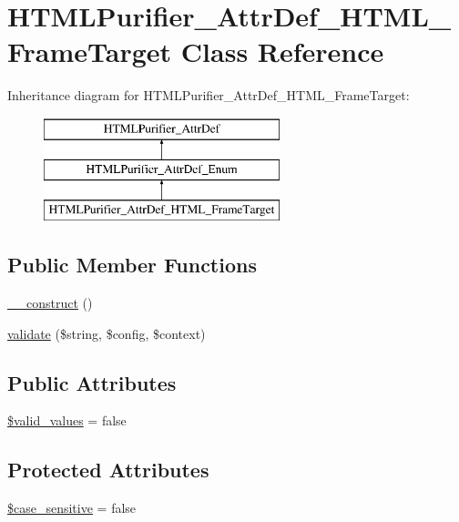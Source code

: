 \hypertarget{classHTMLPurifier__AttrDef__HTML__FrameTarget}{\section{H\+T\+M\+L\+Purifier\+\_\+\+Attr\+Def\+\_\+\+H\+T\+M\+L\+\_\+\+Frame\+Target Class Reference}
\label{classHTMLPurifier__AttrDef__HTML__FrameTarget}
}
Inheritance diagram for H\+T\+M\+L\+Purifier\+\_\+\+Attr\+Def\+\_\+\+H\+T\+M\+L\+\_\+\+Frame\+Target\+:\begin{figure}[H]
\begin{center}
\leavevmode
\includegraphics[height=3.000000cm]{classHTMLPurifier__AttrDef__HTML__FrameTarget}
\end{center}
\end{figure}
\subsection*{Public Member Functions}
\begin{DoxyCompactItemize}
\item 
\hyperlink{classHTMLPurifier__AttrDef__HTML__FrameTarget_a6d29f0eced4e7c1306ac1feeefc7d2a1}{\+\_\+\+\_\+construct} ()
\item 
\hyperlink{classHTMLPurifier__AttrDef__HTML__FrameTarget_a8862dd31211da7035a6ff57a99badd88}{validate} (\$string, \$config, \$context)
\end{DoxyCompactItemize}
\subsection*{Public Attributes}
\begin{DoxyCompactItemize}
\item 
\hyperlink{classHTMLPurifier__AttrDef__HTML__FrameTarget_aa182df884f684070451afdcd407d1ef1}{\$valid\+\_\+values} = false
\end{DoxyCompactItemize}
\subsection*{Protected Attributes}
\begin{DoxyCompactItemize}
\item 
\hyperlink{classHTMLPurifier__AttrDef__HTML__FrameTarget_a48a9bf713e370ee4177404a53b22d5a2}{\$case\+\_\+sensitive} = false
\end{DoxyCompactItemize}
